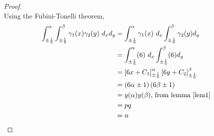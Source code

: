 \documentclass[sigconf,balance=false]{acmart}
\begin{document}
\begin{proof} \ \\ \rm{
Using the Fubini-Tonelli \cite{fubini} theorem,
\begin{align*}
\displaystyle\int_{\pm \frac{1}{6}}^{\alpha} \int_{\pm \frac{1}{6}}^{\beta}\gamma_{1}(x)\gamma_{2}(y) \ d_{x}d_{y}&=\displaystyle\int_{\pm \frac{1}{6}}^{\alpha} \gamma_{1}(x)\ d_{x}\int_{\pm \frac{1}{6}}^{\beta}\gamma_{2}(y)d_{y}\\
&=\displaystyle\int_{\pm \frac{1}{6}}^{\alpha} (6)\ d_{x}\int_{\pm \frac{1}{6}}^{\beta}(6)d_{y}\\
&=\displaystyle\left[6x+ C_{1} \right]_{\pm \frac{1}{6}}^{\alpha}\displaystyle\left[6y+ C_{2} \right]_{\pm \frac{1}{6}}^{\beta}\\
&=\displaystyle\left(6\alpha\pm 1 \right) \left(6\beta\pm 1 \right) \\
&=y(\alpha)y(\beta) \text{, from lemma \ref{lem1}}\\
&=pq\\
&=n
\end{align*}
}
\end{proof}
\end{document}
